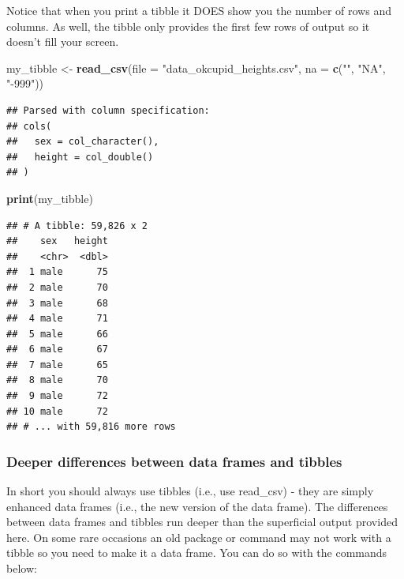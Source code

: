 \documentclass[
]{krantz}
\makeatletter
\newenvironment{Shaded}{\begin{snugshade}}{\end{snugshade}}
\newcommand{\DataTypeTok}[1]{\textcolor[rgb]{0.27,0.27,0.27}{#1}}
\newcommand{\KeywordTok}[1]{\textcolor[rgb]{0.27,0.27,0.27}{\textbf{#1}}}
\newcommand{\NormalTok}[1]{#1}
\newcommand{\StringTok}[1]{\textcolor[rgb]{0.5,0.5,0.5}{#1}}
\newenvironment{kframe}{%
\medskip{}
\setlength{\fboxsep}{.8em}
 \def\at@end@of@kframe{}%
 \ifinner\ifhmode%
  \def\at@end@of@kframe{\end{minipage}}%
  \begin{minipage}{\columnwidth}%
 \fi\fi%
 \def\FrameCommand##1{\hskip\@totalleftmargin \hskip-\fboxsep
 \colorbox{shadecolor}{##1}\hskip-\fboxsep
     \hskip-\linewidth \hskip-\@totalleftmargin \hskip\columnwidth}%
 \MakeFramed {\advance\hsize-\width
   \@totalleftmargin\z@ \linewidth\hsize
   \@setminipage}}%
 {\par\unskip\endMakeFramed%
 \at@end@of@kframe}
\renewenvironment{Shaded}{\begin{kframe}}{\end{kframe}}
\makeatother
\begin{document}
Notice that when you print a tibble it DOES show you the number of rows and columns. As well, the tibble only provides the first few rows of output so it doesn't fill your screen.

\begin{Shaded}
\begin{Highlighting}[]
\NormalTok{my_tibble <-}\StringTok{ }\KeywordTok{read_csv}\NormalTok{(}\DataTypeTok{file =} \StringTok{"data_okcupid_heights.csv"}\NormalTok{, }
                    \DataTypeTok{na =} \KeywordTok{c}\NormalTok{(}\StringTok{""}\NormalTok{, }\StringTok{"NA"}\NormalTok{, }\StringTok{"-999"}\NormalTok{))}
\end{Highlighting}
\end{Shaded}

\begin{verbatim}
## Parsed with column specification:
## cols(
##   sex = col_character(),
##   height = col_double()
## )
\end{verbatim}

\begin{Shaded}
\begin{Highlighting}[]
\KeywordTok{print}\NormalTok{(my_tibble)}
\end{Highlighting}
\end{Shaded}

\begin{verbatim}
## # A tibble: 59,826 x 2
##    sex   height
##    <chr>  <dbl>
##  1 male      75
##  2 male      70
##  3 male      68
##  4 male      71
##  5 male      66
##  6 male      67
##  7 male      65
##  8 male      70
##  9 male      72
## 10 male      72
## # ... with 59,816 more rows
\end{verbatim}

\hypertarget{deeper-differences-between-data-frames-and-tibbles}{%
\subsubsection{Deeper differences between data frames and tibbles}\label{deeper-differences-between-data-frames-and-tibbles}}

In short you should always use tibbles (i.e., use read\_csv) - they are simply enhanced data frames (i.e., the new version of the data frame). The differences between data frames and tibbles run deeper than the superficial output provided here. On some rare occasions an old package or command may not work with a tibble so you need to make it a data frame. You can do so with the commands below:
\end{document}
